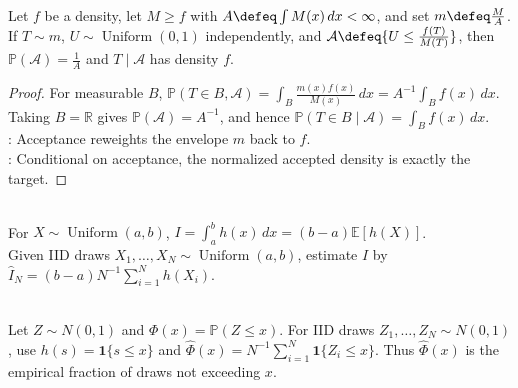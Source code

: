 \begin{proposition} \label{prop:rejection-sampling-correctness} \\
Let $f$ be a density, let $M\geq f$ with $A\defeq\int M(x)\,dx<\infty$, and set $m\defeq \frac{M}{A}$. If $T\sim m$, $U\sim\operatorname{Uniform}(0,1)$ independently, and $\mathcal{A}\defeq\{U\leq \frac{f(T)}{M(T)}\}$, then $\mathbb{P}(\mathcal{A})=\frac{1}{A}$ and $T\mid\mathcal{A}$ has density $f$.
\begin{proof} For measurable $B$, $\mathbb{P}(T\in B,\mathcal{A})=\int_B \frac{m(x)f(x)}{M(x)}\,dx=A^{-1}\int_B f(x)\,dx$.\\
Taking $B=\mathbb{R}$ gives $\mathbb{P}(\mathcal{A})=A^{-1}$, and hence $\mathbb{P}(T\in B\mid\mathcal{A})=\int_B f(x)\,dx$.\\
: Acceptance reweights the envelope $m$ back to $f$.\\
: Conditional on acceptance, the normalized accepted density is exactly the target.
\end{proof}
\end{proposition}

\begin{example} \label{ex:uniform-monte-carlo-integral} \\
For $X\sim\operatorname{Uniform}(a,b)$, $I=\int_a^b h(x)\,dx=(b-a)\mathbb{E}[h(X)]$.\\
Given IID draws $X_1,\ldots,X_N\sim\operatorname{Uniform}(a,b)$, estimate $I$ by $\widehat{I}_N=(b-a)N^{-1}\sum\limits_{i=1}^{N}h(X_i)$.
\end{example}

\begin{example} \label{ex:monte-carlo-normal-cdf} \\
Let $Z\sim N(0,1)$ and $\Phi(x)=\mathbb{P}(Z\leq x)$. For IID draws $Z_1,\ldots,Z_N\sim N(0,1)$, use $h(s)=\mathbf{1}\{s\leq x\}$ and $\widehat{\Phi}(x)=N^{-1}\sum\limits_{i=1}^{N}\mathbf{1}\{Z_i\leq x\}$. Thus $\widehat{\Phi}(x)$ is the empirical fraction of draws not exceeding $x$.
\end{example}

